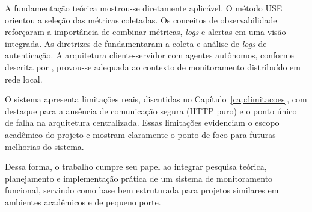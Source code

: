 \documentclass[
    12pt
    ,oneside
    ,a4paper
    ,chapter=TITLE
    ,section=TITLE
    ,sumario=abnt-6027-2012]{abntex2}
\begin{document}
A fundamentação teórica mostrou-se diretamente aplicável. O método USE orientou a
seleção das métricas coletadas. Os conceitos de observabilidade reforçaram a
importância de combinar métricas, \textit{logs} e alertas em uma visão integrada.
As diretrizes de  fundamentaram a coleta e análise de
\textit{logs} de autenticação. A arquitetura cliente-servidor com agentes autônomos,
conforme descrita por , provou-se adequada ao contexto de
monitoramento distribuído em rede local.

O sistema apresenta limitações reais, discutidas no Capítulo~\ref{cap:limitacoes},
com destaque para a ausência de comunicação segura (HTTP puro) e o ponto único de
falha na arquitetura centralizada. Essas limitações evidenciam o escopo acadêmico do
projeto e mostram claramente o ponto de foco para futuras melhorias do sistema.

Dessa forma, o trabalho cumpre seu papel ao integrar pesquisa teórica, planejamento e
implementação prática de um sistema de monitoramento funcional, servindo como base bem 
estruturada para projetos similares em ambientes acadêmicos e de pequeno porte.

\postextual


\end{document}
